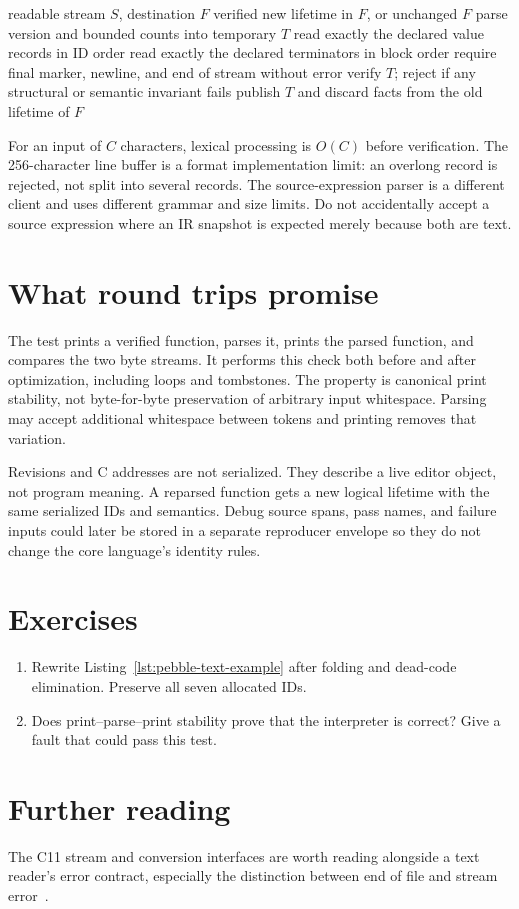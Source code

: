\begin{algorithm}[htbp]
\caption{Parsing a complete IR file without publishing a partial function.}
\label{alg:pebble-text-parse}
\begin{pseudocode}
\Require readable stream $S$, destination $F$
\Ensure verified new lifetime in $F$, or unchanged $F$
\State parse version and bounded counts into temporary $T$
\State read exactly the declared value records in ID order
\State read exactly the declared terminators in block order
\State require final marker, newline, and end of stream without error
\State verify $T$; reject if any structural or semantic invariant fails
\State publish $T$ and discard facts from the old lifetime of $F$
\end{pseudocode}
\end{algorithm}

For an input of $C$ characters, lexical processing is $O(C)$ before verification.
The 256-character line buffer is a format implementation limit: an overlong record is rejected, not split into several records.
The source-expression parser is a different client and uses different grammar and size limits.
Do not accidentally accept a source expression where an IR snapshot is expected merely because both are text.

\section{What round trips promise}
\label{sec:pebble-roundtrip}
The test prints a verified function, parses it, prints the parsed function, and compares the two byte streams.
It performs this check both before and after optimization, including loops and tombstones.
The property is canonical print stability, not byte-for-byte preservation of arbitrary input whitespace.
Parsing may accept additional whitespace between tokens and printing removes that variation.

Revisions and C addresses are not serialized.
They describe a live editor object, not program meaning.
A reparsed function gets a new logical lifetime with the same serialized IDs and semantics.
Debug source spans, pass names, and failure inputs could later be stored in a separate reproducer envelope so they do not change the core language's identity rules.

\section{Exercises}
\label{sec:pebble-seven-exercises}
\begin{enumerate}
\item \label{ex:pebble-text-fold} Rewrite Listing~\ref{lst:pebble-text-example} after folding and dead-code elimination. Preserve all seven allocated IDs.
\item \label{ex:pebble-roundtrip-contract} Does print--parse--print stability prove that the interpreter is correct? Give a fault that could pass this test.
\end{enumerate}

\section{Further reading}
\label{sec:pebble-seven-reading}
The C11 stream and conversion interfaces are worth reading alongside a text reader's error contract, especially the distinction between end of file and stream error~\cite[Section~7.21]{wg14-2011-c11}.
